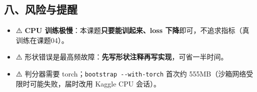 \documentclass[
  chinese,
  11pt,
]{ctexart}
\providecommand{\tightlist}{%
  \setlength{\itemsep}{0pt}\setlength{\parskip}{0pt}}
\begin{document}
\subsection{八、风险与提醒}\label{ux516bux98ceux9669ux4e0eux63d0ux9192}

\begin{itemize}
\tightlist
\item
  ⚠️ \textbf{CPU 训练极慢}：本课题\textbf{只要能训起来、loss 下降}即可，不追求指标（真训练在课题04）。
\item
  ⚠️ 形状错误是最高频故障：\textbf{先写形状注释再写实现}，可省一半时间。
\item
  ⚠️ 判分器需要 torch；\texttt{bootstrap\ -\/-with-torch} 首次约 555MB（沙箱网络受限时可能失败，届时改用 Kaggle CPU 会话）。
\end{itemize}
\end{document}
